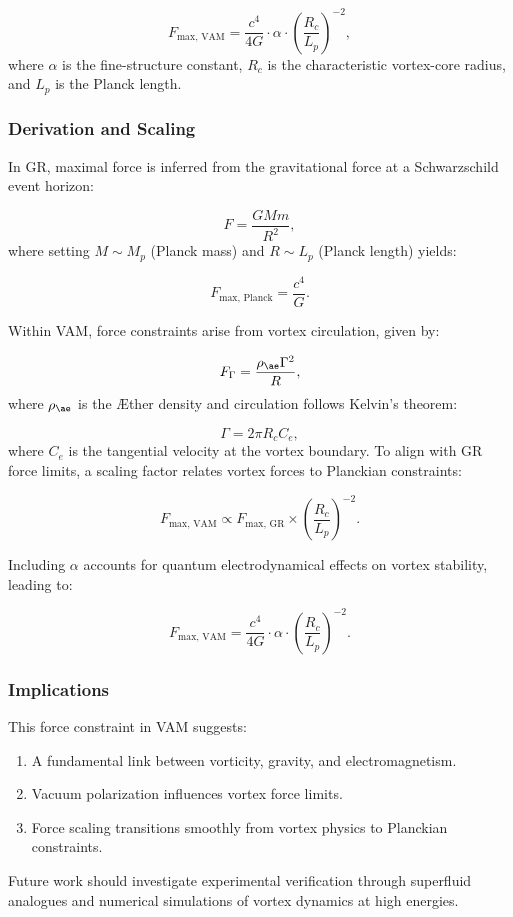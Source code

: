 \begin{equation*}
    F_{\text{max, VAM}} = \frac{c^4}{4G} \cdot \alpha \cdot \left(\frac{R_c}{L_p}\right)^{-2},
\end{equation*}
where $\alpha$ is the fine-structure constant, $R_c$ is the characteristic vortex-core radius, and $L_p$ is the Planck length.


\subsubsection*{Derivation and Scaling}
In GR, maximal force is inferred from the gravitational force at a Schwarzschild event horizon:


\begin{equation*}
    F = \frac{GMm}{R^2},
\end{equation*}
where setting $M \sim M_p$ (Planck mass) and $R \sim L_p$ (Planck length) yields:


\begin{equation*}
    F_{\text{max, Planck}} = \frac{c^4}{G}.
\end{equation*}


Within VAM, force constraints arise from vortex circulation, given by:


\begin{equation*}
    F_{\Gamma} = \frac{\rho_{\ae} \Gamma^2}{R},
\end{equation*}
where $\rho_{\ae}$ is the \AE ther density and circulation follows Kelvin’s theorem:


\begin{equation*}
    \Gamma = 2\pi R_c C_e,
\end{equation*}
where $C_e$ is the tangential velocity at the vortex boundary. To align with GR force limits, a scaling factor relates vortex forces to Planckian constraints:


\begin{equation*}
    F_{\text{max, VAM}} \propto F_{\text{max, GR}} \times \left(\frac{R_c}{L_p}\right)^{-2}.
\end{equation*}


Including $\alpha$ accounts for quantum electrodynamical effects on vortex stability, leading to:


\begin{equation*}
    F_{\text{max, VAM}} = \frac{c^4}{4G} \cdot \alpha \cdot \left(\frac{R_c}{L_p}\right)^{-2}.
\end{equation*}


\subsubsection*{Implications}
This force constraint in VAM suggests:
\begin{enumerate}
    \item A fundamental link between vorticity, gravity, and electromagnetism.
    \item Vacuum polarization influences vortex force limits.
    \item Force scaling transitions smoothly from vortex physics to Planckian constraints.
\end{enumerate}


Future work should investigate experimental verification through superfluid analogues and numerical simulations of vortex dynamics at high energies.
